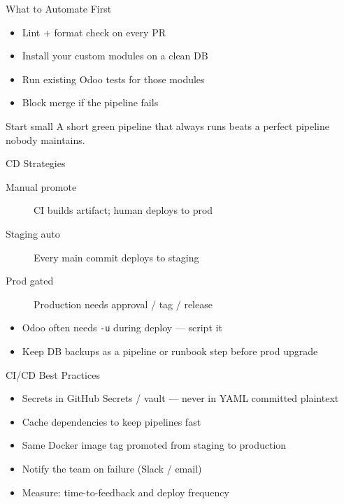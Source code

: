 \begin{frame}{What to Automate First}
\begin{itemize}
  \item Lint + format check on every PR
  \item Install your custom modules on a clean DB
  \item Run existing Odoo tests for those modules
  \item Block merge if the pipeline fails
\end{itemize}

\vspace{0.5em}
\begin{alertblock}{Start small}
  A short green pipeline that always runs beats a perfect pipeline nobody maintains.
\end{alertblock}
\end{frame}

\begin{frame}{CD Strategies}
\begin{description}
  \item[Manual promote] CI builds artifact; human deploys to prod
  \item[Staging auto] Every main commit deploys to staging
  \item[Prod gated] Production needs approval / tag / release
\end{description}

\vspace{0.5em}
\begin{itemize}
  \item Odoo often needs \texttt{-u} during deploy --- script it
  \item Keep DB backups as a pipeline or runbook step before prod upgrade
\end{itemize}
\end{frame}

\begin{frame}{CI/CD Best Practices}
\begin{itemize}
  \item Secrets in GitHub Secrets / vault --- never in YAML committed plaintext
  \item Cache dependencies to keep pipelines fast
  \item Same Docker image tag promoted from staging to production
  \item Notify the team on failure (Slack / email)
  \item Measure: time-to-feedback and deploy frequency
\end{itemize}
\end{frame}

